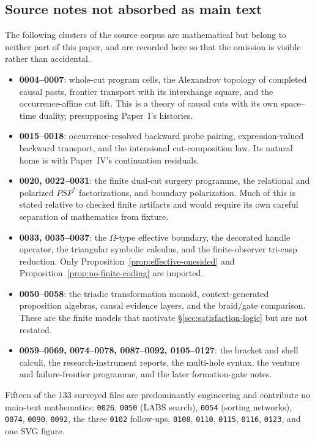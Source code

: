 \subsection{Source notes not absorbed as main text}

The following clusters of the source corpus are mathematical but belong to neither part of
this paper, and are recorded here so that the omission is visible rather than accidental.

\begin{itemize}
\item \textbf{0004--0007}: whole-cut program cells, the Alexandrov topology of completed
  causal pasts, frontier transport with its interchange square, and the occurrence-affine cut
  lift.  This is a theory of causal cuts with its own space--time duality, presupposing
  Paper~I's histories.
\item \textbf{0015--0018}: occurrence-resolved backward probe pairing, expression-valued
  backward transport, and the intensional cut-composition law.  Its natural home is with
  Paper~IV's continuation residuals.
\item \textbf{0020, 0022--0031}: the finite dual-cut surgery programme, the relational and
  polarized $PSP^{\ast}$ factorizations, and boundary polarization.  Much of this is stated
  relative to checked finite artifacts and would require its own careful separation of
  mathematics from fixture.
\item \textbf{0033, 0035--0037}: the $\Omega$-type effective boundary, the decorated handle
  operator, the triangular symbolic calculus, and the finite-observer tri-cusp reduction.
  Only Proposition~\ref{prop:effective-onesided} and
  Proposition~\ref{prop:no-finite-coding} are imported.
\item \textbf{0050--0058}: the triadic transformation monoid, context-generated proposition
  algebras, causal evidence layers, and the braid/gate comparison.  These are the finite
  models that motivate \S\ref{sec:satisfaction-logic} but are not restated.
\item \textbf{0059--0069, 0074--0078, 0087--0092, 0105--0127}: the bracket and shell
  calculi, the research-instrument reports, the multi-hole syntax, the venture and
  failure-frontier programme, and the later formation-gate notes.
\end{itemize}

Fifteen of the 133 surveyed files are predominantly engineering and contribute no main-text
mathematics: \texttt{0026}, \texttt{0050} (LABS search), \texttt{0054} (sorting networks),
\texttt{0074}, \texttt{0090}, \texttt{0092}, the three \texttt{0102} follow-ups,
\texttt{0108}, \texttt{0110}, \texttt{0115}, \texttt{0116}, \texttt{0123}, and one SVG
figure.
